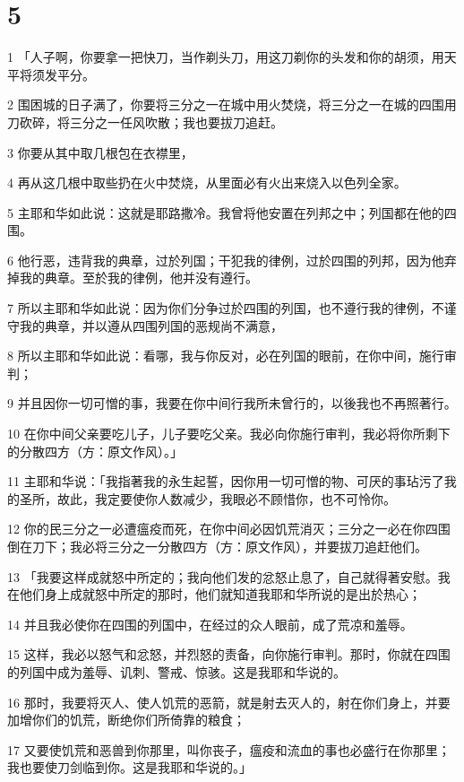 \chapter{5}

\par 1 「人子啊，你要拿一把快刀，当作剃头刀，用这刀剃你的头发和你的胡须，用天平将须发平分。
\par 2 围困城的日子满了，你要将三分之一在城中用火焚烧，将三分之一在城的四围用刀砍碎，将三分之一任风吹散；我也要拔刀追赶。
\par 3 你要从其中取几根包在衣襟里，
\par 4 再从这几根中取些扔在火中焚烧，从里面必有火出来烧入以色列全家。
\par 5 主耶和华如此说：这就是耶路撒冷。我曾将他安置在列邦之中；列国都在他的四围。
\par 6 他行恶，违背我的典章，过於列国；干犯我的律例，过於四围的列邦，因为他弃掉我的典章。至於我的律例，他并没有遵行。
\par 7 所以主耶和华如此说：因为你们分争过於四围的列国，也不遵行我的律例，不谨守我的典章，并以遵从四围列国的恶规尚不满意，
\par 8 所以主耶和华如此说：看哪，我与你反对，必在列国的眼前，在你中间，施行审判；
\par 9 并且因你一切可憎的事，我要在你中间行我所未曾行的，以後我也不再照著行。
\par 10 在你中间父亲要吃儿子，儿子要吃父亲。我必向你施行审判，我必将你所剩下的分散四方（方：原文作风）。」
\par 11 主耶和华说：「我指著我的永生起誓，因你用一切可憎的物、可厌的事玷污了我的圣所，故此，我定要使你人数减少，我眼必不顾惜你，也不可怜你。
\par 12 你的民三分之一必遭瘟疫而死，在你中间必因饥荒消灭；三分之一必在你四围倒在刀下；我必将三分之一分散四方（方：原文作风），并要拔刀追赶他们。
\par 13 「我要这样成就怒中所定的；我向他们发的忿怒止息了，自己就得著安慰。我在他们身上成就怒中所定的那时，他们就知道我耶和华所说的是出於热心；
\par 14 并且我必使你在四围的列国中，在经过的众人眼前，成了荒凉和羞辱。
\par 15 这样，我必以怒气和忿怒，并烈怒的责备，向你施行审判。那时，你就在四围的列国中成为羞辱、讥刺、警戒、惊骇。这是我耶和华说的。
\par 16 那时，我要将灭人、使人饥荒的恶箭，就是射去灭人的，射在你们身上，并要加增你们的饥荒，断绝你们所倚靠的粮食；
\par 17 又要使饥荒和恶兽到你那里，叫你丧子，瘟疫和流血的事也必盛行在你那里；我也要使刀剑临到你。这是我耶和华说的。」

